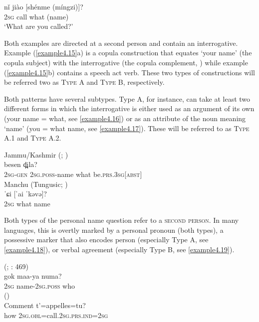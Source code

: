 \documentclass[output=paper,colorlinks,citecolor=brown]{langscibook}
\begin{document}
    \ex
    \gll nǐ		jiào		[shénme		(míngzi)]?\\
    2\textsc{sg} 	call		what		(name)\\
    \glt ‘What are you called?’
    \z
\z

Both examples are directed at a second person and contain an interrogative. Example (\ref{example4.15}a) is a copula construction that equates ‘your name’ (the copula subject) with the interrogative (the copula complement, \citealt{Dixon2010a}) while example (\ref{example4.15}b) contains a speech act verb. These two types of constructions will be referred two as \textsc{Type A} and \textsc{Type B}, respectively.

Both patterns have several subtypes. Type A, for instance, can take at least two different forms in which the interrogative is either used as an argument of its own (your name = what, see \ref{example4.16}) or as an attribute of the noun meaning ‘name’ (you = what name, see \ref{example4.17}). These will be referred to as \textsc{Type A.1} and \textsc{Type A.2}.

\ea
    \label{example4.16}
    Jammu/Kashmir  (; \citealt[148]{Munshi2006})\\
    \gll [um-e		gu-yik]			besen	d̪̪ila?\\
    2\textsc{sg-gen}		2\textsc{sg.poss}-name		what		be.\textsc{prs.3sg[abst]}\\
\ex
    \label{example4.17}
     Manchu (Tungusic; \citealt[239]{Dai2012})\\
    \gll ˈɕi			[ˈai			ˈkəvə]?\\
    2\textsc{sg}			what			name\\
\z

Both types of the personal name question refer to a \textsc{second person}. In many languages, this is overtly marked by a personal pronoun (both types), a possessive marker that also encodes person (especially Type A, see \ref{example4.18}), or verbal agreement (especially Type B, see \ref{example4.19}).

\ea
    \label{example4.18}
     (; \citealt[469]{Sarvasy2017}: 469)\\
    \gll gok		maa-ya			numa?\\
    2\textsc{sg}		name-2\textsc{sg.poss}		who\\
\ex
    \label{example4.19}
     ()\\
    \gll Comment	t’=appelles=tu?\\
    how			2\textsc{sg.obl}=call.2\textsc{sg.prs.ind=2sg}\\
    \z
\end{document}
